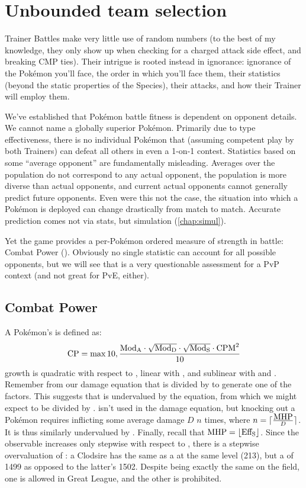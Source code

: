 \chapter{Unbounded team selection\label{chap:unbounded}}
Trainer Battles make very little use of random numbers (to the best of my
 knowledge, they only show up when checking for a charged attack side
 effect, and breaking CMP ties).
Their intrigue is rooted instead in ignorance: ignorance of
 the Pokémon you'll face, the order in which you'll face them,
 their statistics (beyond the static properties of the Species),
 their attacks, and how their Trainer will employ them.

We've established that Pokémon battle fitness is dependent on opponent details.
We cannot name a globally superior Pokémon.
Primarily due to type effectiveness, there is no individual Pokémon that
  (assuming competent play by both Trainers) can defeat all others in even a
  1-on-1 contest.
Statistics based on some ``average opponent'' are fundamentally misleading.
Averages over the population do not correspond to any actual opponent,
 the population is more diverse than actual opponents,
 and current actual opponents cannot generally predict future opponents.
Even were this not the case, the situation into which a Pokémon is deployed
 can change drastically from match to match.
Accurate prediction comes not via stats, but simulation (\autoref{chap:simul}).

Yet the game provides a per-Pokémon ordered measure of strength in battle: Combat Power (\CP).
Obviously no single statistic can account for all possible opponents, but
 we will see that \CP{} is a very questionable assessment for a PvP
 context (and not great for PvE, either).

\section{Combat Power\label{sec:cp}}
A Pokémon's \CP{} is defined as:
\[ \mbox{CP} = \max{10, \frac{\mbox{$\text{Mod}_\text{A}$} \cdot \sqrt{\mbox{$\text{Mod}_\text{D}$}} \cdot \sqrt{\mbox{$\text{Mod}_\text{S}$}} \cdot \mbox{CPM}^2}{10}} \]
\CP{} growth is quadratic with respect to \CPM, linear with , and
  sublinear with  and .
Remember from our damage equation that  is divided by 
 to generate one of the factors.
This suggests that  is undervalued by the \CP{} equation, from which
 we might expect  to be divided by .
\MHP{} isn't used in the damage equation, but knocking out a Pokémon
 requires inflicting some average damage $D$ $n$ times,
 where $n = \lceil\frac{\mbox{MHP}}{D}\rceil$.
It is thus similarly undervalued by \CP\@.
Finally, recall that $\mbox{MHP} = \lfloor \mbox{$\text{Eff}_\text{S}$} \rfloor$.
Since the observable \MHP{} increases only stepwise with respect to ,
  there is a stepwise overvaluation of : a  Clodsire has the same \MHP{}
  as a  at the same level (213), but a \CP{} of 1499 as
  opposed to the latter's 1502.
Despite being exactly the same on the field, one is allowed in Great League,
  and the other is prohibited.

